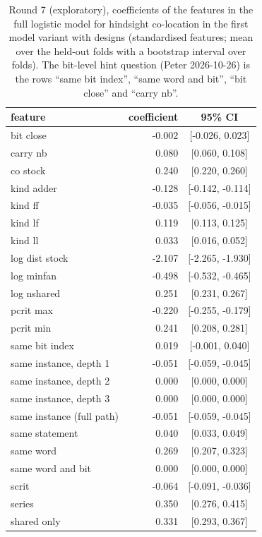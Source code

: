 \begin{table}[t]
\caption{Round 7 (exploratory), coefficients of the features in the full logistic model for hindsight co-location in the first model variant with designs (standardised features; mean over the held-out folds with a bootstrap interval over folds). The bit-level hint question (Peter 2026-10-26) is the rows ``same bit index'', ``same word and bit'', ``bit close'' and ``carry nb''.}
\label{tab:r7coef}
\centering\scriptsize
\begin{tabular}{@{}lrc@{}}
\toprule
feature & coefficient & 95\% CI \\
\midrule
bit close & -0.002 & [-0.026, 0.023] \\
carry nb & 0.080 & [0.060, 0.108] \\
co stock & 0.240 & [0.220, 0.260] \\
kind adder & -0.128 & [-0.142, -0.114] \\
kind ff & -0.035 & [-0.056, -0.015] \\
kind lf & 0.119 & [0.113, 0.125] \\
kind ll & 0.033 & [0.016, 0.052] \\
log dist stock & -2.107 & [-2.265, -1.930] \\
log minfan & -0.498 & [-0.532, -0.465] \\
log nshared & 0.251 & [0.231, 0.267] \\
pcrit max & -0.220 & [-0.255, -0.179] \\
pcrit min & 0.241 & [0.208, 0.281] \\
same bit index & 0.019 & [-0.001, 0.040] \\
same instance, depth 1 & -0.051 & [-0.059, -0.045] \\
same instance, depth 2 & 0.000 & [0.000, 0.000] \\
same instance, depth 3 & 0.000 & [0.000, 0.000] \\
same instance (full path) & -0.051 & [-0.059, -0.045] \\
same statement & 0.040 & [0.033, 0.049] \\
same word & 0.269 & [0.207, 0.323] \\
same word and bit & 0.000 & [0.000, 0.000] \\
scrit & -0.064 & [-0.091, -0.036] \\
series & 0.350 & [0.276, 0.415] \\
shared only & 0.331 & [0.293, 0.367] \\
\bottomrule
\end{tabular}
\end{table}

